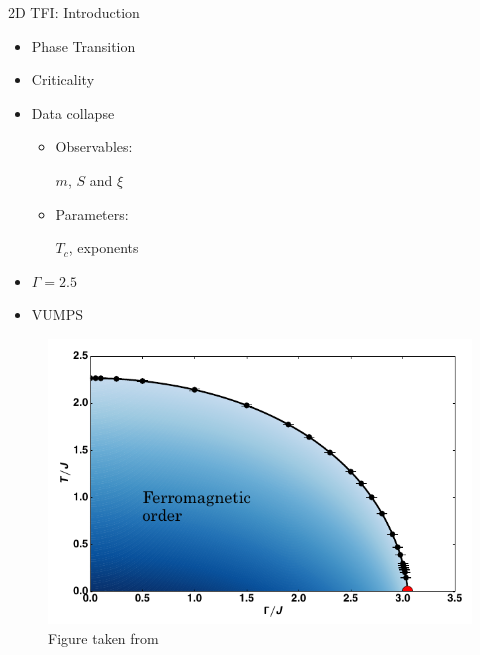 \begin{frame}{2D TFI: Introduction}
    \begin{minipage}{0.35\textwidth}
        \begin{itemize}
            \item Phase Transition
            \item Criticality
            \item Data collapse
                  \begin{itemize}
                      \item Observables:

                            $m$, $S$ and $\xi$
                      \item Parameters:

                            $T_c$, exponents
                  \end{itemize}
            \item $\Gamma=2.5$
            \item VUMPS
        \end{itemize}
    \end{minipage}
    \begin{minipage}{0.64\textwidth}
        \begin{figure}
            \centering
            \includegraphics[width=\linewidth]{../Figuren/phsyics/2disingphase.png}
            \caption*{Figure taken from \cite{Hesselmann2016}  }
        \end{figure}
    \end{minipage}
\end{frame}


